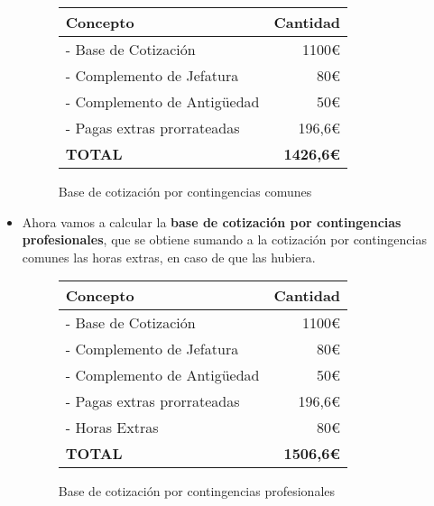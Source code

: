 \begin{itemize}
\begin{figure}[H]
        \begin{tabular}{| l | r |}
            \hline
            \textbf{Concepto}  & \textbf{Cantidad} \\ \hline
            \centering - Base de Cotización & 1100€  \\ \hline
            \centering - Complemento de Jefatura & 80€  \\ \hline
            \centering - Complemento de Antigüedad & 50€  \\ \hline
            \centering - Pagas extras prorrateadas &  196,6€ \\ \hline
            \centering \textbf{TOTAL} &  \textbf{1426,6€} \\ \hline
        \end{tabular}
        \caption{Base de cotización por contingencias comunes}
    \end{figure}


    \item Ahora vamos a calcular la \textbf{base de cotización por contingencias profesionales}, que se obtiene sumando a la cotización por contingencias comunes las horas extras, en caso de que las hubiera.

     \begin{figure}[H]

        \vspace{3ex}
        \centering

        \setlength{\tabcolsep}{10pt}
        \renewcommand{\arraystretch}{1.4}

        \begin{tabular}{| l | r |}
            \hline
            \textbf{Concepto}  & \textbf{Cantidad} \\ \hline
            \centering - Base de Cotización & 1100€  \\ \hline
            \centering - Complemento de Jefatura & 80€  \\ \hline
            \centering - Complemento de Antigüedad & 50€  \\ \hline
            \centering - Pagas extras prorrateadas &  196,6€ \\ \hline
            \centering - Horas Extras & 80€  \\ \hline
            \centering \textbf{TOTAL} &  \textbf{1506,6€} \\ \hline
        \end{tabular}
        \caption{Base de cotización por contingencias profesionales}
    \end{figure}


\end{itemize}
